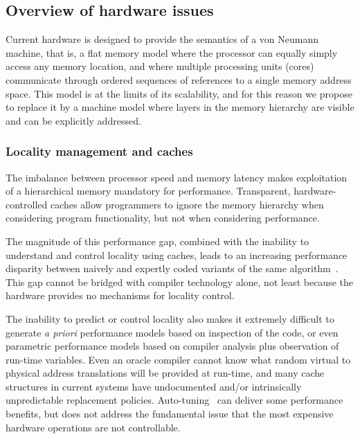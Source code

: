 \subsection{Overview of hardware issues}
\label{sec:hw}

Current hardware is designed to provide the semantics of a von Neumann
machine, that is, a flat memory model where the processor can equally
simply access any memory location, and where multiple processing units
(cores) communicate through ordered sequences of references to a single
memory address space.   This model is at the limits of its scalability, and
for this reason we propose to replace it by a machine model where
layers in the memory hierarchy are visible and can be explicitly
addressed. 


\subsubsection{Locality management and caches}

The imbalance between processor speed and memory latency makes
exploitation of a hierarchical memory mandatory for performance.  Transparent, 
hardware-controlled caches allow programmers to ignore the memory hierarchy
when considering program functionality, but not when considering performance.

The magnitude of this performance gap, combined with  the inability to understand and 
control locality using caches, leads to an increasing performance disparity between naively
and expertly coded variants of the same algorithm~\cite{GotoGeijn:2008:Anatomy}.  This gap
cannot be bridged with compiler technology alone, not least because the hardware
provides no mechanisms for locality control.  

The inability to predict or control locality also makes it extremely difficult to generate
\textit{a priori} performance models based on inspection of the code, or even parametric
performance models based on compiler analysis plus observation of run-time variables.
Even an oracle compiler cannot know what random virtual to physical address translations
will be provided at run-time, and many cache structures in current systems have 
undocumented and/or intrinsically unpredictable replacement policies.
Auto-tuning~\cite{DemEtAl:ieeeproc2004,ButtEijkLang:spmvp}
can deliver some performance benefits, but does not address the fundamental issue 
that the most expensive hardware operations are not controllable.

